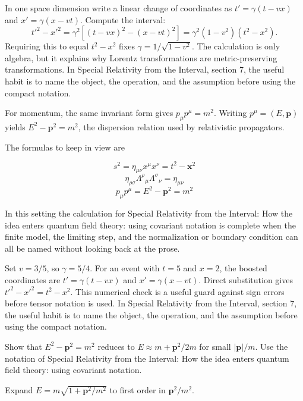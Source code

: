 In one space dimension write a linear change of coordinates as \(t'=\gamma(t-vx)\) and \(x'=\gamma(x-vt)\).  Compute the interval:
\[
  t'^2-x'^2
  =
  \gamma^2[(t-vx)^2-(x-vt)^2]
  =
  \gamma^2(1-v^2)(t^2-x^2).
\]
Requiring this to equal \(t^2-x^2\) fixes \(\gamma=1/\sqrt{1-v^2}\).  The calculation is only algebra, but it explains why Lorentz transformations are metric-preserving transformations.  In Special Relativity from the Interval, section 7, the useful habit is to name the object, the operation, and the assumption before using the compact notation.

For momentum, the same invariant form gives \(p_\mu p^\mu=m^2\).  Writing \(p^\mu=(E,\bm p)\) yields \(E^2-\bm p^2=m^2\), the dispersion relation used by relativistic propagators.

The formulas to keep in view are

\[
  s^2=\eta_{\mu\nu}x^\mu x^\nu=t^2-\bm x^2
\]
\[
  \eta_{\rho\sigma}\Lambda^\rho{}_\mu\Lambda^\sigma{}_\nu=\eta_{\mu\nu}
\]
\[
  p_\mu p^\mu=E^2-\bm p^2=m^2
\]

In this setting the calculation for Special Relativity from the Interval: How the idea enters quantum field theory: using covariant notation is complete when the finite model, the limiting step, and the normalization or boundary condition can all be named without looking back at the prose.




\begin{example}
Set \(v=3/5\), so \(\gamma=5/4\).  For an event with \(t=5\) and \(x=2\), the boosted coordinates are \(t'=\gamma(t-vx)\) and \(x'=\gamma(x-vt)\).  Direct substitution gives \(t'^2-x'^2=t^2-x^2\).  This numerical check is a useful guard against sign errors before tensor notation is used.  In Special Relativity from the Interval, section 7, the useful habit is to name the object, the operation, and the assumption before using the compact notation.
\end{example}



\begin{exercise}
Show that \(E^2-\bm p^2=m^2\) reduces to \(E\approx m+\bm p^2/2m\) for small \(|\bm p|/m\).  Use the notation of Special Relativity from the Interval: How the idea enters quantum field theory: using covariant notation.
\begin{answer}
Expand \(E=m\sqrt{1+\bm p^2/m^2}\) to first order in \(\bm p^2/m^2\).
\end{answer}
\end{exercise}

